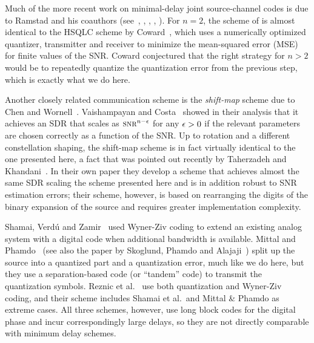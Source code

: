 Much of the more recent work on minimal-delay joint source-channel codes is due
to Ramstad and his coauthors (see~\cite{Ramstad2002}, \cite{FloorR2006},
\cite{CowardR2000,CowardR2000a}, \cite{WernerssonSR2007}, \cite{HeklandFR2009}).
For $n=2$, the scheme of  is almost identical to the HSQLC
scheme by Coward~\cite{Coward2001}, which uses a numerically optimized
quantizer, transmitter and receiver to minimize the mean-squared error (MSE) for
finite values of the SNR. Coward conjectured that the right strategy for $n > 2$
would be to repeatedly quantize the quantization error from the previous step,
which is exactly what we do here.

Another closely related communication scheme is the \emph{shift-map} scheme due
to Chen and Wornell~\cite{ChenW1998}.  Vaishampayan and
Costa~\cite{VaishampayanC2003} showed in their analysis that it achieves an SDR
that scales as $\snr^{n-\e}$ for any $\epsilon > 0$ if the relevant parameters are
chosen correctly as a function of the SNR. Up to rotation and a different
constellation shaping, the shift-map scheme is in fact virtually identical to
the one presented here, a fact that was pointed out recently by Taherzadeh and
Khandani~\cite{TaherzadehK2008}. In their own paper they develop a scheme that
achieves almost the same SDR scaling the scheme presented here and is in
addition robust to SNR estimation errors; their scheme, however, is based on
rearranging the digits of the binary expansion of the source and requires
greater implementation complexity.

Shamai, Verd\'u and Zamir~\cite{ShamaiVZ1998} used Wyner-Ziv coding to extend an
existing analog system with a digital code when additional bandwidth is
available. Mittal and Phamdo~\cite{MittalP2002} (see also the paper by Skoglund,
Phamdo and Alajaji~\cite{SkoglundPA2002}) split up the source into a quantized
part and a quantization error, much like we do here, but they use a
separation-based code (or ``tandem'' code) to transmit the quantization symbols.
Reznic et al.~\cite{ReznicFZ2006} use both quantization and Wyner-Ziv coding,
and their scheme includes Shamai et al.\ and Mittal \& Phamdo as extreme cases.
All three schemes, however, use long block codes for the digital phase and incur
correspondingly large delays, so they are not directly comparable with minimum
delay schemes.







